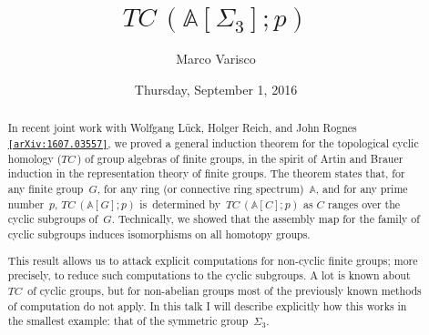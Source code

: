 \documentclass{UAmathtalk}
\author{Marco Varisco}
\title{\(\mathit{TC\,}(\mathbb{A}[\Sigma_3];p)\)}
\date{Thursday, September 1, 2016}
\begin{document}
\maketitle

\begin{abstract}
In recent joint work with Wolfgang Lück, Holger Reich, and John Rognes
\href{https://arxiv.org/abs/1607.03557/}{\texttt{[arXiv:1607.03557]}},
we proved a general induction theorem for the topological cyclic homology ($\mathit{TC\,}$) of group algebras of finite groups, in the spirit of Artin and Brauer induction in the representation theory of finite groups.
The theorem states that, for any finite group~$G$, for any ring (or connective ring spectrum)~$\mathbb{A}$, and for any prime number~$p$, $\mathit{TC\,}(\mathbb{A}[G];p)$ is~determined by~$\mathit{TC\,}(\mathbb{A}[C];p)$ as $C$ ranges over the cyclic subgroups of~$G$.
Technically, we showed that the assembly map for the family of cyclic subgroups induces isomorphisms on all homotopy groups.

This result allows us to attack explicit computations for non-cyclic finite groups; more precisely, to reduce such computations to the cyclic subgroups.
A lot is known about~$\mathit{TC\,}$ of cyclic groups, but for non-abelian groups most of the previously known methods of computation do not apply.
In this talk I will describe explicitly how this works in the smallest example: that of the symmetric group~$\Sigma_3$.
\end{abstract}
\end{document}
